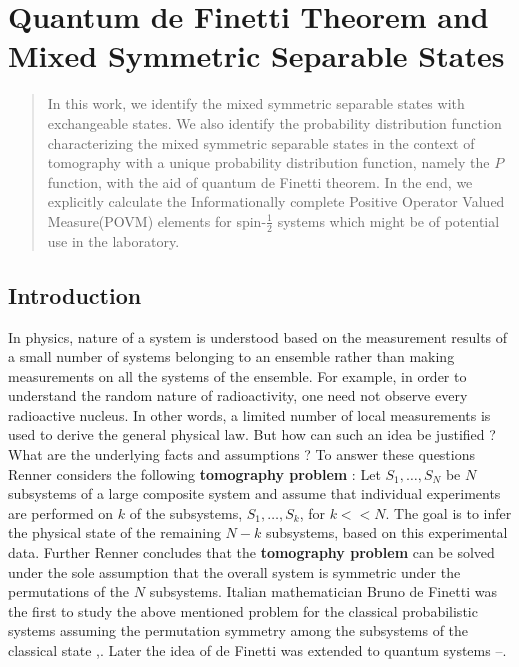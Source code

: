 \chapter[Quantum de Finetti Theorem and Mixed Symmetric\hfil\break Separable States]{Quantum de Finetti Theorem and Mixed Symmetric Separable States}\label{chap27}


\begin{abstract}
In this work, we identify the mixed symmetric separable states with exchangeable states. We also identify the probability distribution function characterizing the mixed symmetric separable states in the context of tomography with a unique probability distribution function, namely the $P$ function, with the aid of quantum de Finetti theorem. In the end, we explicitly calculate the Informationally complete Positive Operator Valued Measure(POVM) elements for spin-$\frac{1}{2}$ systems which might be of potential use in the laboratory.
\end{abstract}

\section{Introduction}\label{chap27-sec1}

In physics, nature of a system is understood based on the measurement results of a small number of systems belonging to an ensemble rather than making measurements on all the systems of the ensemble. For example, in order to understand the random nature of radioactivity, one need not observe every radioactive nucleus. In other words, a limited number of local measurements is used to derive the general physical law. But how can such an idea be justified ? What are the underlying facts and assumptions ? To answer these questions Renner \cite{chap27-key1} considers the following \textbf{tomography problem} : Let $S_{1},\ldots,S_{N}$ be $N$ subsystems of a large composite system and assume that individual experiments are performed on $k$ of the subsystems, $S_{1},\ldots,S_{k}$, for $k<<N$. The goal is to infer the physical state of the remaining $N-k$ subsystems, based on this experimental data. Further Renner\cite{chap27-key1} concludes that the \textbf{tomography problem} can be solved under the sole assumption that the overall system is symmetric under the permutations of the $N$ subsystems. Italian mathematician Bruno de Finetti was the first to study the above mentioned problem for the classical probabilistic systems assuming the permutation symmetry among the subsystems of the classical state \cite{chap27-key2},\cite{chap27-key3}. Later the idea of de Finetti was extended to quantum systems \cite{chap27-key4}--\cite{chap27-key7}.

